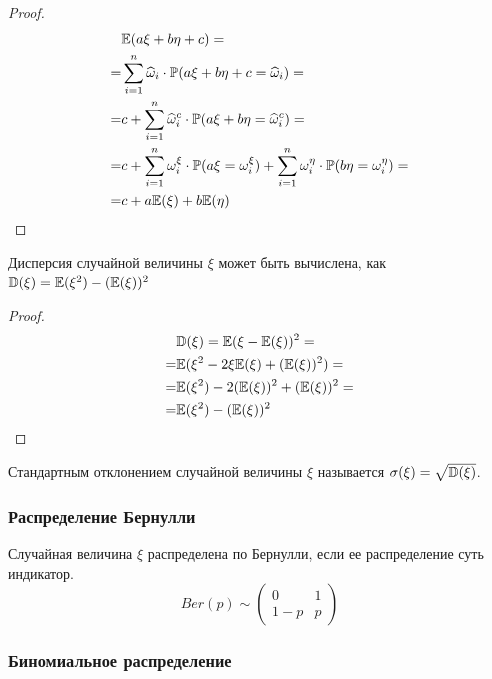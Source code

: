 \documentclass[12pt]{article}
\begin{document}
\begin{proof}
    \begin{align*}
        &\mathbb{E}(a\xi+b\eta+c)=\\
        =&\sum_{i=1}^n \widehat{\omega}_i\cdot\mathbb{P}(a\xi+b\eta+c=\widehat{\omega}_i)=\\
        =&c+\sum_{i=1}^n \widehat{\omega}_i^c\cdot\mathbb{P}(a\xi+b\eta=\widehat{\omega}_i^c)=\\
        =&c+\sum_{i=1}^n \omega_i^\xi\cdot \mathbb{P}(a\xi=\omega_i^\xi)+\sum_{i=1}^n \omega_i^\eta\cdot\mathbb{P}(b\eta=\omega_i^\eta)=\\            =&c+a\mathbb{E}(\xi)+b\mathbb{E}(\eta)
    \end{align*}
\end{proof}

\begin{theorem}
    Дисперсия случайной величины $\xi$ может быть вычислена, как $\mathbb{D}(\xi)=\mathbb{E}(\xi^2)-(\mathbb{E}(\xi))^2$
\end{theorem}

\begin{proof}
    \begin{align*}
        &\mathbb{D}(\xi)=\mathbb{E}(\xi-\mathbb{E}(\xi))^2=\\
        =&\mathbb{E}(\xi^2-2\xi\mathbb{E}(\xi)+(\mathbb{E}(\xi))^2)=\\
        =&\mathbb{E}(\xi^2)-2(\mathbb{E}(\xi))^2+(\mathbb{E}(\xi))^2=\\
        =&\mathbb{E}(\xi^2)-(\mathbb{E}(\xi))^2
    \end{align*}
\end{proof}

\begin{definition}
    Стандартным отклонением случайной величины $\xi$ называется $\sigma(\xi)=\sqrt{\mathbb{D}(\xi)}$.
\end{definition}

    \subsubsection{Распределение Бернулли}

\begin{definition}
    Случайная величина $\xi$  распределена по Бернулли, если ее распределение суть индикатор.
    $$Ber(p)\sim \begin{pmatrix}
        0 & 1\\
        1-p & p
    \end{pmatrix}$$
\end{definition}

    \subsubsection{Биномиальное распределение}
\end{document}
